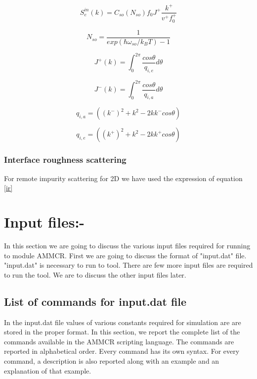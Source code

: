 \documentclass[12pt]{article}
\begin{document}
\begin{equation}
S_{e}^{in}(k) = C_{so} (N_{so}) f_{0}  J^+\frac{k^+}{v^+ f_{0}^+}
\label{ab_in_sc_so}
\end{equation}


\begin{equation}
N_{so} = \frac{1}{exp(\hbar\omega_{so}/k_B T) - 1}
\label{N_so}
\end{equation}

\begin{equation}
J^{+}(k) = \int_0^{2\pi} \frac{cos \theta}{q_{i,e}}  d\theta 
\label{J_plus_so}
\end{equation}

\begin{equation}
J^{-}(k) = \int_0^{2\pi} \frac{cos \theta}{q_{i,a}} d\theta 
\label{J_minus_so}
\end{equation}

\begin{equation}
q_{i,a} = \left( \left( k^{-}\right)^2 + k^2 - 2k k^{-} cos \theta \right)
\label{q_ab_so}
\end{equation}

\begin{equation}
q_{i,e} = \left( \left( k^{+}\right)^2 + k^2  - 2k k^{+} cos \theta \right)
\label{q_em_so}
\end{equation}

\subsubsection{Interface roughness scattering}
For remote impurity scattering for 2D we have used the expression of equation \ref{ir}


\section{Input files:-} \label{input_files}
In this section we are going to discuss the various input files required for running to module AMMCR. First we are going to discuss the format of "input.dat" file. "input.dat" is necessary to run to tool. There are few more input files are required to run the tool. We are to discuss the other input files later. 

\subsection{List of commands for input.dat file}
In the input.dat file values of various constants required for simulation are are stored in the proper format. In this section, we report the complete list of the commands available in the AMMCR scripting language. The commands are reported in alphabetical order. Every command has its own syntax. For every command, a description is also reported along with an example and an explanation of that example.
\end{document}
